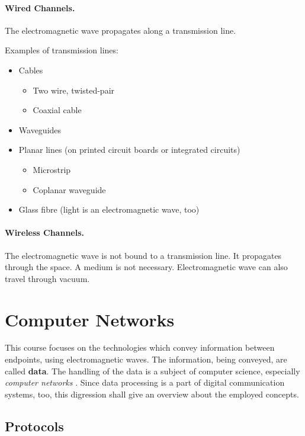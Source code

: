 \paragraph{Wired Channels.}

The electromagnetic wave propagates along a transmission line.

Examples of transmission lines:
\begin{itemize}
	\item Cables
	\begin{itemize}
		\item Two wire, twisted-pair 
		\item Coaxial cable 
	\end{itemize}
	\item Waveguides 
	\item Planar lines (on printed circuit boards or integrated circuits)
	\begin{itemize}
		\item Microstrip 
		\item Coplanar waveguide 
	\end{itemize}
	\item Glass fibre (light is an electromagnetic wave, too)
\end{itemize}

\paragraph{Wireless Channels.}

The electromagnetic wave is not bound to a transmission line. It propagates through the space. A medium is not necessary. Electromagnetic wave can also travel through vacuum.


\section{Computer Networks}


This course focuses on the technologies which convey information between endpoints, using electromagnetic waves. The information, being conveyed, are called \textbf{data}. The handling of the data is a subject of computer science, especially \emph{computer networks} . Since data processing is a part of digital communication systems, too, this digression shall give an overview about the employed concepts.


\subsection{Protocols}

